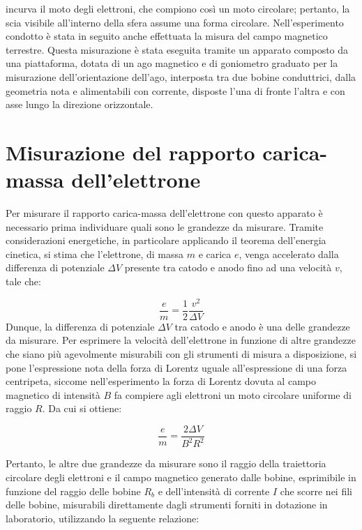 \documentclass[a4paper,12pt]{article}
\begin{document}
incurva il moto degli elettroni, che compiono così un moto circolare; pertanto, la scia visibile all’interno della sfera assume una forma circolare. 
Nell’esperimento condotto è stata in seguito anche effettuata la misura del campo magnetico terrestre. Questa misurazione è stata eseguita tramite un apparato composto da una piattaforma, dotata di un ago magnetico e di goniometro graduato per la misurazione dell’orientazione dell’ago, interposta tra due bobine conduttrici, dalla geometria nota e alimentabili con corrente, disposte l’una di fronte l’altra e con asse lungo la direzione orizzontale. 

\section{Misurazione del rapporto carica-massa dell’elettrone}
Per misurare il rapporto carica-massa dell’elettrone con questo apparato è necessario prima individuare quali sono le grandezze da misurare.
Tramite considerazioni energetiche, in particolare applicando il teorema dell’energia cinetica, si stima che l’elettrone, di massa \( m \) e carica \( e \), venga accelerato dalla differenza di potenziale \( \Delta V \) presente tra catodo e anodo fino ad una velocità \( v \), tale che:

\begin{equation}
    \frac{e}{m} = \frac{1}{2} \frac{v^2}{\Delta V}
    \label{eq:rapporto_carica_massa}
\end{equation}
Dunque, la differenza di potenziale \( \Delta V \) tra catodo e anodo è una delle grandezze da misurare.
Per esprimere la velocità dell’elettrone in funzione di altre grandezze che siano più agevolmente misurabili con gli strumenti di misura a disposizione, si pone l’espressione nota della forza di Lorentz uguale all’espressione di una forza centripeta, siccome nell’esperimento la forza di Lorentz dovuta al campo magnetico di intensità \( B \) fa compiere agli elettroni un moto circolare uniforme di raggio \( R \). Da cui si ottiene:

\begin{equation}
    \frac{e}{m} = \frac{2 \Delta V}{B^2 R^2}
    \label{eq:forza_lorentz}
\end{equation}

Pertanto, le altre due grandezze da misurare sono il raggio della traiettoria circolare degli elettroni e il campo magnetico generato dalle bobine, esprimibile in funzione del raggio delle bobine \( R_b \) e dell’intensità di corrente \( I \) che scorre nei fili delle bobine, misurabili direttamente dagli strumenti forniti in dotazione in laboratorio, utilizzando la seguente relazione:
\end{document}
